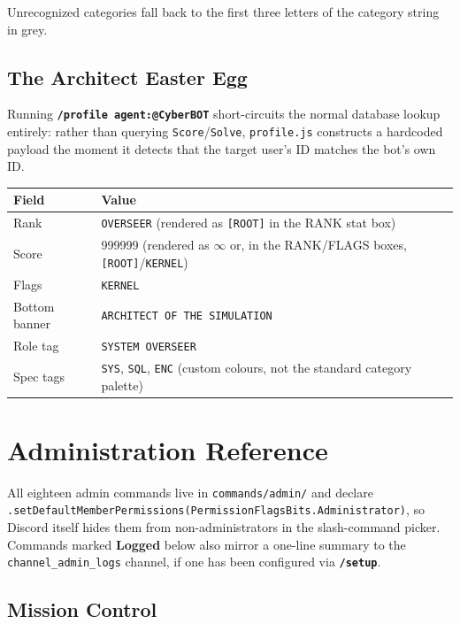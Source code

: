 \documentclass[12pt,a4paper]{report}
\newcommand{\cmd}[1]{\texttt{\color{cybercyan}\textbf{#1}}}
\newcommand{\file}[1]{\texttt{\color{cyberpurple!80!black}#1}}
\begin{document}
Unrecognized categories fall back to the first three letters of the category string in grey.

\section{The Architect Easter Egg}

Running \cmd{/profile agent:@CyberBOT} short-circuits the normal database lookup entirely: rather
than querying \texttt{Score}/\texttt{Solve}, \file{profile.js} constructs a hardcoded payload the
moment it detects that the target user's ID matches the bot's own ID.

\begin{center}
\begin{tabular}{l l}
\toprule
\textbf{Field} & \textbf{Value} \\
\midrule
Rank           & \texttt{OVERSEER} (rendered as \texttt{[ROOT]} in the RANK stat box) \\
Score          & 999999 (rendered as $\infty$ or, in the RANK/FLAGS boxes, \texttt{[ROOT]}/\texttt{KERNEL}) \\
Flags          & \texttt{KERNEL} \\
Bottom banner  & \texttt{ARCHITECT OF THE SIMULATION} \\
Role tag       & \texttt{SYSTEM OVERSEER} \\
Spec tags      & \texttt{SYS}, \texttt{SQL}, \texttt{ENC} (custom colours, not the standard category palette) \\
\bottomrule
\end{tabular}
\end{center}

\newpage
\chapter{Administration Reference}

All eighteen admin commands live in \file{commands/admin/} and declare
\texttt{.setDefaultMemberPermissions(PermissionFlagsBits.Administrator)}, so Discord itself hides
them from non-administrators in the slash-command picker. Commands marked \textbf{Logged} below
also mirror a one-line summary to the \texttt{channel\_admin\_logs} channel, if one has been
configured via \cmd{/setup}.

\section{Mission Control}
\end{document}

